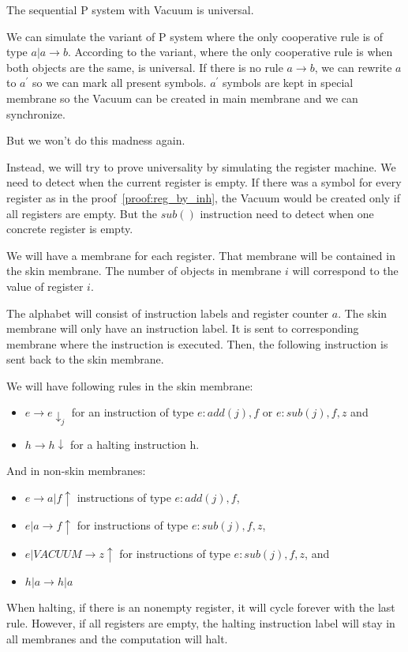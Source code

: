 \begin{veta}
  The sequential P system with Vacuum is universal.
\end{veta}

\begin{dokaz}
  We can simulate the variant of P system where the only cooperative rule is of type $a|a \rightarrow b$. According to \cite{Ibarra04dang} the variant, where the only cooperative rule is when both objects are the same, is universal. If there is no rule $a \rightarrow b$, we can rewrite $a$ to $a^{\prime}$ so we can mark all present symbols. $a^{\prime}$ symbols are kept in special membrane so the Vacuum can be created in main membrane and we can synchronize.
  
  But we won't do this madness again.
  
  Instead, we will try to prove universality by simulating the register machine. We need to detect when the current register is empty. If there was a symbol for every register as in the proof~\ref{proof:reg_by_inh}, the Vacuum would be created only if all registers are empty. But the $sub()$ instruction need to detect when one concrete register is empty.
  
  We will have a membrane for each register. That membrane will be contained in the skin membrane. The number of objects in membrane $i$ will correspond to the value of register $i$.
  
  The alphabet will consist of instruction labels and register counter $a$. The skin membrane will only have an instruction label. It is sent to corresponding membrane where the instruction is executed. Then, the following instruction is sent back to the skin membrane.
  
  We will have following rules in the skin membrane:
  
  \begin{itemize}
  \item $e \rightarrow e\downarrow_j$ for an instruction of type $e : add(j), f$ or $e : sub(j), f, z$ and
  \item $h \rightarrow h\downarrow$ for a halting instruction h.
  \end{itemize}
  
  And in non-skin membranes:
  
  \begin{itemize}
  \item $e \rightarrow a|f\uparrow$ instructions of type $e : add(j), f$,
  \item $e|a \rightarrow f\uparrow$ for instructions of type $e : sub(j), f, z$,
  \item $e|VACUUM \rightarrow z\uparrow$ for instructions of type $e : sub(j), f, z$, and
  \item $h|a \rightarrow h|a$
  \end{itemize}

  When halting, if there is an nonempty register, it will cycle forever with the last rule. However, if all registers are empty, the halting instruction label will stay in all membranes and the computation will halt.
  
\end{dokaz}